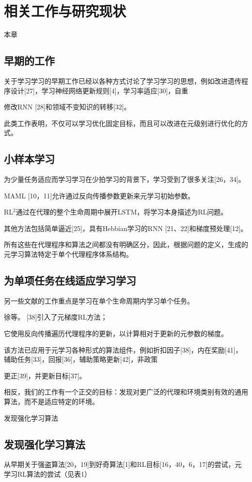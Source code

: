 \chapter{相关工作与研究现状}
\label{cha:sysu-thesis-latex-install-guide}

本章


\section{早期的工作}


关于学习学习的早期工作已经以各种方式讨论了学习学习的思想，例如改进遗传程序设计[27]，学习神经网络更新规则[4]，学习率适应[30]，自重

修改RNN [28]和领域不​​变知识的转移[32]。

此类工作表明，不仅可以学习优化固定目标，而且可以改进在元级别进行优化的方式。

\section{小样本学习}
为少量任务适应而学习学习在少拍学习的背景下，学习受到了很多关注[26，34]。 

MAML [10，11]允许通过反向传播参数更新来元学习初始参数。 

RL$^2$通过在代理的整个生命周期中展开LSTM，将学习本身描述为RL问题。

其他方法包括简单逼近[25]，具有Hebbian学习的RNN [21、22]和梯度预处理[12]。

所有这些在代理程序和算法之间都没有明确区分，因此，根据问题的定义，生成的元学习算法特定于单个代理程序体系结构。

\section{为单项任务在线适应学习学习}
另一些文献的工作重点是学习在单个生命周期内学习单个任务。

徐等。 [38]引入了元梯度RL方法；

它使用反向传播遍历代理程序的更新，以计算相对于更新的元参数的梯度。

该方法已应用于元学习各种形式的算法组件，例如折扣因子[38]，内在奖励[41]，辅助任务[33]，回报[36]，辅助策略更新[42]，非政策

更正[39]，并更新目标[37]。

相反，我们的工作有一个正交的目标：发现对更广泛的代理和环境类别有效的通用算法，而不是适应特定的环境。

发现强化学习算法

\section{发现强化学习算法}
从早期关于强盗算法[20，19]到好奇算法[1]和RL目标[16，40，6，17]的尝试，元学习RL算法的尝试（见表1）

